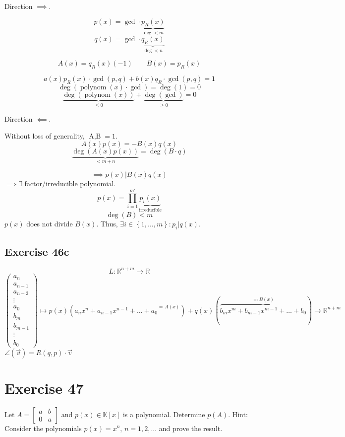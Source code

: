 \documentclass[a4paper]{article}
\theoremstyle{definition}
\newcommand\set[1]{\left\{#1\right\}}
\begin{document}
Direction $\implies$.

\[ p(x) = \operatorname{gcd} \cdot \underbrace{p_R(x)}_{\deg < m} \]
\[ q(x) = \operatorname{gcd} \cdot \underbrace{q_R(x)}_{\deg < n} \]

\[ A(x) = q_R(x)(-1) \qquad B(x) = p_R(x) \]

\[ a(x) p_R(x) \cdot \operatorname{gcd}(p, q) + b(x) q_R \cdot \operatorname{gcd}(p, q) = 1 \]
\[ \deg(\operatorname{polynom}(x) \cdot \operatorname{gcd}) = \deg(1) = 0 \]
\[ \underbrace{\deg(\operatorname{polynom}(x))}_{\leq 0} + \underbrace{\deg(\operatorname{gcd})}_{\geq 0} = 0 \]

Direction $\impliedby$.

Without loss of generality, $\operatorname{A, B} = 1$.
\[ A(x) p(x) = -B(x) q(x) \]
\[ \underbrace{\deg(A(x) p(x))}_{< m + n} = \deg(B \cdot q) \]

\[ \implies p(x) | B(x) q(x) \]
$\implies \exists$ factor/irreducible polynomial.
\[ p(x) = \prod_{i=1}^{m'} \underbrace{p_i(x)}_{\text{irreducible}} \]
\[ \deg(B) < m \]
$p(x)$ does not divide $B(x)$. Thus, $\exists i \in \set{1, \dots, m}: p_i | q(x)$.

\subsection{Exercise 46c}

\[ L: \mathbb R^{n + m} \to \mathbb R \]
\[ \begin{pmatrix} a_n \\ a_{n-1} \\ a_{n-2} \\ \vdots \\ a_0 \\ b_m \\ b_{m-1} \\ \vdots \\ b_0 \end{pmatrix} \mapsto p(x) ({a_n x^n + a_{n-1} x^{n-1} + \dots + a_0}^{\eqqcolon A(x)}) + q(x) (\overbrace{b_m x^m + b_{m-1} x^{m-1} + \dots + b_0}^{\eqqcolon B(x)}) \to \mathbb R^{n + m} \]
$\angle(\vec v) = R(q, p) \cdot \vec v$

\section*{Exercise 47}
\begin{ex}
  Let $A = \begin{bmatrix} a & b \\ 0 & a \end{bmatrix}$ and $p(x) \in \mathbb K[x]$ is a polynomial.
  Determine $p(A)$. Hint: Consider the polynomials $p(x) = x^n$, $n = 1, 2, \dots$ and prove the result.
\end{ex}
\end{document}

